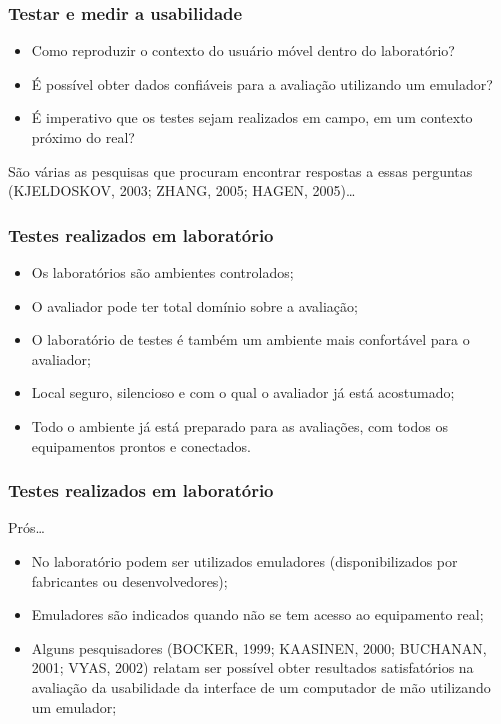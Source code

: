 \documentclass[presentation]{beamer}
\begin{document}
\begin{frame}[c]\frametitle{Testar e medir a usabilidade}
    
    \begin{itemize}
        \item Como reproduzir o contexto do usuário móvel dentro do laboratório?
        \item É possível obter dados confiáveis para a avaliação utilizando um emulador?
        \item É imperativo que os testes sejam realizados em campo, em um contexto próximo do real?
    \end{itemize}

    São várias as pesquisas que procuram encontrar respostas a essas perguntas (KJELDOSKOV, 2003; ZHANG, 2005; HAGEN, 2005)\ldots

\end{frame}

\begin{frame}[c]\frametitle{Testes realizados em laboratório}
    
\begin{itemize}
    \item Os laboratórios são ambientes controlados;
    \item O avaliador pode ter total domínio  sobre a avaliação;
    \item O laboratório de testes é também um ambiente mais confortável para o avaliador;
    \item Local seguro, silencioso e com o qual o avaliador já está acostumado;
    \item Todo o ambiente já está preparado para as avaliações, com todos os equipamentos prontos e conectados.
\end{itemize}

\end{frame}

\begin{frame}[c]\frametitle{Testes realizados em laboratório}
   
    Prós\ldots
    \begin{itemize}
        \item No laboratório podem ser utilizados emuladores (disponibilizados por fabricantes ou desenvolvedores);
        \item Emuladores são indicados quando não se tem acesso ao equipamento real;
        \item Alguns pesquisadores (BOCKER, 1999; KAASINEN, 2000; BUCHANAN, 2001; VYAS, 2002) relatam ser possível obter resultados satisfatórios na avaliação da usabilidade da interface de um computador de mão utilizando um emulador;
    \end{itemize}

\end{frame}
    
\end{document}
